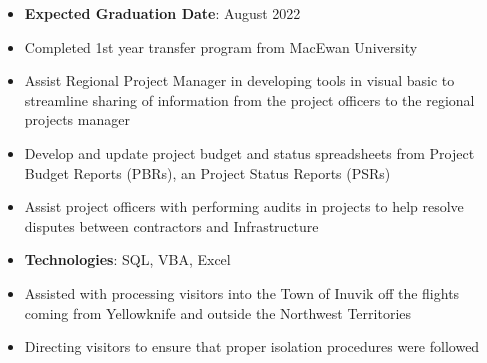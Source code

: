 \documentclass[10pt, letterpaper, ragged2e, withhyper]{altacv}
\begin{document}
\tagline{}

\makecvheader


\begin{paracol}{2}
        \begin{itemize}
            \item \textbf{Expected Graduation Date}: August 2022
            \item Completed 1st year transfer program from MacEwan University
        \end{itemize}


            \begin{itemize}
                \item Assist Regional Project Manager in developing tools in visual basic to streamline sharing of information from the 
                      project officers to the regional projects manager
                \item Develop and update project budget and status spreadsheets from Project Budget Reports (PBRs), an Project Status 
                      Reports (PSRs)
                \item Assist project officers with performing audits in projects to help resolve disputes between contractors and Infrastructure 
                \item \textbf{Technologies}: SQL, VBA, Excel 
            \end{itemize}

            \begin{itemize}
                \item Assisted with processing visitors into the Town of Inuvik off the flights coming from Yellowknife and outside the Northwest Territories
                \item Directing visitors to ensure that proper isolation procedures were followed
            \end{itemize}


\end{paracol}
\end{document}
